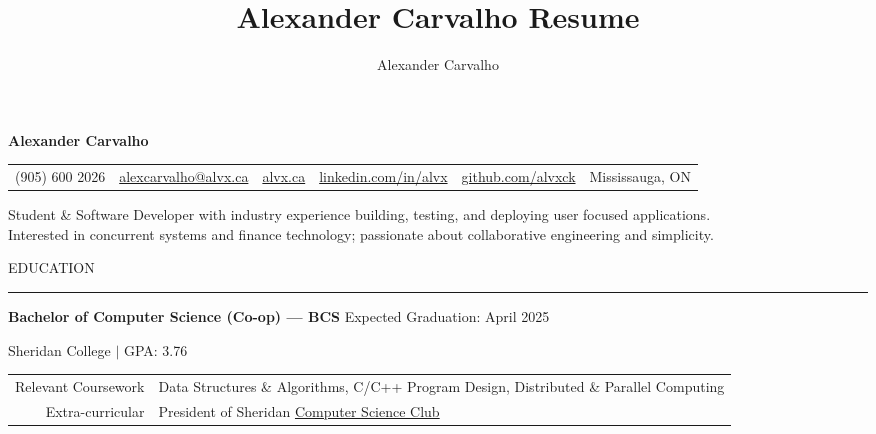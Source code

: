 \documentclass[9pt]{extarticle}
\title{Alexander Carvalho Resume}
\author{Alexander Carvalho}
\begin{document}
\color{regtextgray}


\begin{center}
	\textcolor{imptextblack}{\textbf{\Huge Alexander Carvalho}}

	\begin{tabular}{ c c c c c c }
		\textcolor{imptextblack}{(905) 600 2026} & 
		\href{mailto:alexcarvalho@alvx.ca}{alexcarvalho@alvx.ca} & 
		\href{alvx.ca}{alvx.ca} & 
		\href{https://www.linkedin.com/in/alvx}{linkedin.com/in/alvx} & 
		\href{https://www.github.com/alvxck}{github.com/alvxck} & 
		\textcolor{imptextblack}{Mississauga, ON}
	\end{tabular}

	\vspace{5pt}	

	Student \& Software Developer with industry experience building, testing, and deploying user focused applications.  \\
	Interested in concurrent systems and finance technology; passionate about collaborative engineering and simplicity.
\end{center}


\begin{adjustwidth}{4pt}{4pt} \large EDUCATION \end{adjustwidth}
\rule[8pt]{\linewidth}{0.4pt}

\begin{adjustwidth}{10pt}{10pt}
	\vspace{-10pt}	

	\textcolor{imptextblack}{\textbf{\large Bachelor of Computer Science (Co-op) — BCS}} \hfill Expected Graduation: April 2025
	
	Sheridan College $|$ GPA: 3.76
	
	\begin{tabular}{ r l }
	 	\textcolor{imptextblack}{Relevant Coursework} & Data Structures \& Algorithms, C/C++ Program Design, Distributed \& Parallel Computing \\ 
		\textcolor{imptextblack}{Extra-curricular} & President of Sheridan \href{https://sheridancollege.campuslabs.ca/engage/organization/mobilecomputingclub}{Computer Science Club} \\
	\end{tabular}
\end{adjustwidth}
\end{document}
